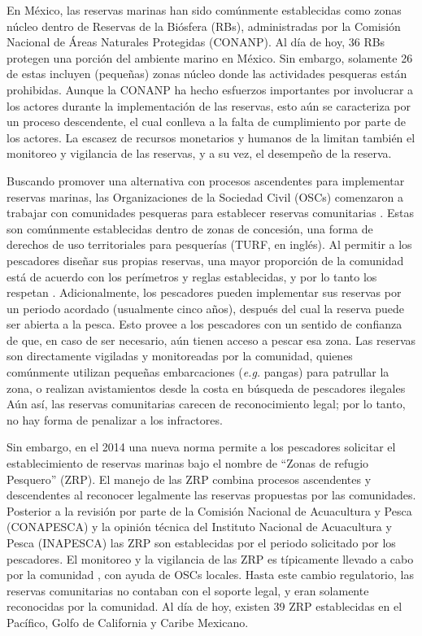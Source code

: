\documentclass{frontiersSCNS}
\begin{document}
En México, las reservas marinas han sido comúnmente establecidas como
zonas núcleo dentro de Reservas de la Biósfera (RBs), administradas por
la Comisión Nacional de Áreas Naturales Protegidas (CONANP). Al día de
hoy, 36 RBs protegen una porción del ambiente marino en México. Sin
embargo, solamente 26 de estas incluyen (pequeñas) zonas núcleo donde
las actividades pesqueras están prohibidas. Aunque la CONANP ha hecho
esfuerzos importantes por involucrar a los actores durante la
implementación de las reservas, esto aún se caracteriza por un proceso
descendente, el cual conlleva a la falta de cumplimiento por parte de
los actores. La escasez de recursos monetarios y humanos de la limitan
también el monitoreo y vigilancia de las reservas, y a su vez, el
desempeño de la reserva.

Buscando promover una alternativa con procesos ascendentes para
implementar reservas marinas, las Organizaciones de la Sociedad Civil
(OSCs) comenzaron a trabajar con comunidades pesqueras para establecer
reservas comunitarias \citep{uribe_2010-u2} . Estas son comúnmente
establecidas dentro de zonas de concesión, una forma de derechos de uso
territoriales para pesquerías (TURF, en inglés). Al permitir a los
pescadores diseñar sus propias reservas, una mayor proporción de la
comunidad está de acuerdo con los perímetros y reglas establecidas, y
por lo tanto los respetan
\citep{gelcich_2015-Gw,espinosaromero_2014-PY,beger_2004-Y8} .
Adicionalmente, los pescadores pueden implementar sus reservas por un
periodo acordado (usualmente cinco años), después del cual la reserva
puede ser abierta a la pesca. Esto provee a los pescadores con un
sentido de confianza de que, en caso de ser necesario, aún tienen acceso
a pescar esa zona. Las reservas son directamente vigiladas y
monitoreadas por la comunidad, quienes comúnmente utilizan pequeñas
embarcaciones (\emph{e.g.} pangas) para patrullar la zona, o realizan
avistamientos desde la costa en búsqueda de pescadores ilegales Aún así,
las reservas comunitarias carecen de reconocimiento legal; por lo tanto,
no hay forma de penalizar a los infractores.

Sin embargo, en el 2014 una nueva norma \citep{nom049sagpesc_2014-V6}
permite a los pescadores solicitar el establecimiento de reservas
marinas bajo el nombre de ``Zonas de refugio Pesquero'' (ZRP). El manejo
de las ZRP combina procesos ascendentes y descendentes al reconocer
legalmente las reservas propuestas por las comunidades. Posterior a la
revisión por parte de la Comisión Nacional de Acuacultura y Pesca
(CONAPESCA) y la opinión técnica del Instituto Nacional de Acuacultura y
Pesca (INAPESCA) las ZRP son establecidas por el periodo solicitado por
los pescadores. El monitoreo y la vigilancia de las ZRP es típicamente
llevado a cabo por la comunidad , con ayuda de OSCs locales. Hasta este
cambio regulatorio, las reservas comunitarias no contaban con el soporte
legal, y eran solamente reconocidas por la comunidad. Al día de hoy,
existen 39 ZRP establecidas en el Pacífico, Golfo de California y Caribe
Mexicano.
\end{document}
